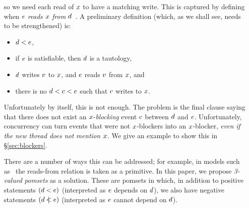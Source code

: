 so we need each read of $x$ to have a matching write.
This is captured by defining when $e$ \emph{reads $x$ from} $d$~\cite{alglave}.
A preliminary definition (which, as we shall see, needs to be strengthened) is:
\begin{itemize}
\item $d < e$,
\item if $e$ is satisfiable, then $d$ is a tautology,
\item $d$ writes $v$ to $x$,
  and $e$ reads $v$ from $x$, and
\item there is no $d < c < e$ such that
  $c$ writes to $x$.
\end{itemize}
Unfortunately by itself, this is not enough. The problem is the final
clause saying that there does not exist an $x$-\emph{blocking}
event $c$ between $d$ and $e$. Unfortunately, concurrency can
turn events that were not $x$-blockers into an $x$-blocker,
\emph{even if the new thread does not mention $x$.}
We give an example to show this in \S\ref{sec:blockers}.

There are a number of ways this can be addressed; for example,
in models such as~\cite{Batty:2011:MCC:1926385.1926394} the reads-from relation is taken
as a primitive. In this paper, we propose \emph{3-valued pomsets}
as a solution. These are pomsets in which, in addition to positive statements
$(d < e)$ (interpreted as $e$ depends on $d$),
we also have negative statements $(d \mathrel{\,\mid\!\!\!<} e)$
(interpreted as $e$ cannot depend on $d$).

